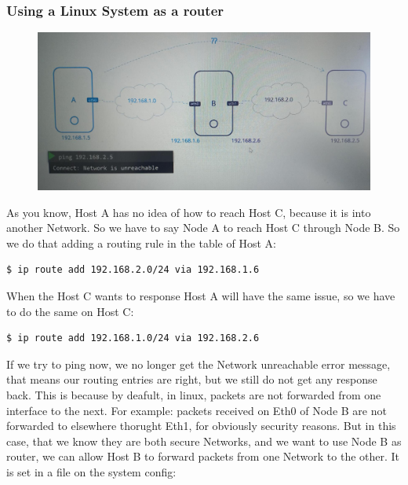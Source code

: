 \documentclass{article}
\newenvironment{codetemplate}[1][]{%
  \mybasecolorbox[#1]
  \itshape
}{%
  \endmybasecolorbox
}
\begin{document}
\subsubsection{Using a Linux System as a router}

\begin{figure}[H]
    \includegraphics[width=\textwidth]{pictures/ntw6.png}
\end{figure}

As you know, Host A has no idea of how to reach Host C, because it is into another Network. So we have to say Node A to reach Host C through Node B. So we do that adding a routing rule in the table of Host A:

\begin{codetemplate}{}
\begin{verbatim}
$ ip route add 192.168.2.0/24 via 192.168.1.6
\end{verbatim}
\end{codetemplate}

When the Host C wants to response Host A will have the same issue, so we have to do the same on Host C:
\begin{codetemplate}{}
\begin{verbatim}
$ ip route add 192.168.1.0/24 via 192.168.2.6
\end{verbatim}
\end{codetemplate}

If we try to ping now, we no longer get the Network unreachable error message, that means our routing entries are right, but we still do not get any response back. This is because by deafult, in linux, packets are not forwarded from one interface to the next. For example: packets received on Eth0 of Node B are not forwarded to elsewhere thorught Eth1, for obviously security reasons. But in this case, that we know they are both secure Networks, and we want to use Node B as router, we can allow Host B to forward packets  from one Network to the other. It is set in a file on the system config:
\end{document}

